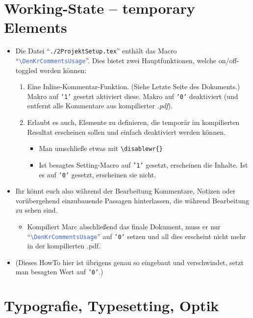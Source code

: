 \section*{Working-State -- temporary Elements}

\begin{itemize}
    \item Die Datei \enquote{\textcolor{PineGreen}{\texttt{./2ProjektSetup.tex}}} enthält das Macro \enquote{\textcolor{RoyalBlue}{\texttt{\textbackslash DenKrCommentsUsage}}}. Dies bietet zwei Hauptfunktionen, welche on/off-toggled werden können:
    \begin{enumerate}
        \item Eine Inline-Kommentar-Funktion. (Siehe Letzte Seite des Dokuments.) Makro auf \texttt{'1'} gesetzt aktiviert diese. Makro auf \texttt{'0'} deaktiviert (und entfernt alle Kommentare aus kompilierter \textit{.pdf}).
        \item Erlaubt es auch, Elemente zu definieren, die temporär im kompilierten Resultat erscheinen sollen und einfach deaktiviert werden können.
        \begin{itemize}
            \item Man umschließe etwas mit \texttt{\textcolor{Bittersweet}{\textbackslash disablewr}\{\}}
            \item Ist besagtes Setting-Macro auf \texttt{'1'} gesetzt, erscheinen die Inhalte. Ist es auf \texttt{'0'} gesetzt, erscheinen sie nicht.
        \end{itemize}
    \end{enumerate}
    \item[\labsigAsym] Ihr könnt euch also während der Bearbeitung Kommentare, Notizen oder vorübergehend einzubauende Passagen hinterlassen, die während Bearbeitung zu sehen sind.
    \begin{itemize}
        \item Kompiliert Marc abschließend das finale Dokument, muss er nur \enquote{\textcolor{RoyalBlue}{\texttt{\textbackslash DenKrCommentsUsage}}} auf \texttt{'0'} setzen und all dies erscheint nicht mehr in der kompilierten .pdf.
    \end{itemize}
    \item (Dieses HowTo hier ist übrigens genau so eingebaut und verschwindet, setzt man besagten Wert auf \texttt{'0'}.)
\end{itemize}




\section*{Typografie, Typesetting, Optik}

